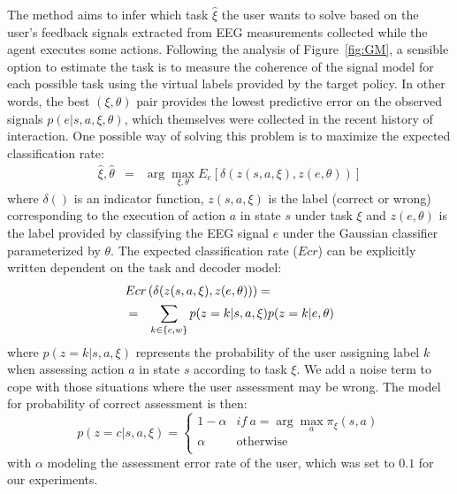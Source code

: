 The method aims to infer which task $\hat{\xi}$ the user wants to solve based on the user's feedback signals extracted from EEG measurements collected while the agent executes some actions. Following the analysis of Figure~\ref{fig:GM}, a sensible option to estimate the task is to measure the coherence of the signal model for each possible task using the virtual labels provided by the target policy. In other words, the best $(\xi,\theta)$ pair provides the lowest predictive error on the observed signals $p(e|s,a,\xi,\theta)$, which themselves were collected in the recent history of interaction. One possible way of solving this problem is to maximize the expected classification rate:
%
\begin{eqnarray}
\hat{\xi},\hat{\theta}&=& \arg\max_{\xi,\theta} E_e\left[ \delta(z(s,a,\xi), z(e,\theta)) \right]
\end{eqnarray}
%
where $\delta()$ is an indicator function, $z(s,a,\xi)$ is the label (correct or wrong) corresponding to the execution of action $a$ in state $s$ under task $\xi$ and $z(e,\theta)$ is the label provided by classifying the EEG signal $e$ under the Gaussian classifier parameterized by $\theta$. The expected classification rate ($Ecr$) can be explicitly written dependent on the task and decoder model:
%
\begin{eqnarray}
\lefteqn{Ecr\left( \delta(z(s,a,\xi), z(e,\theta)) \right) =}\nonumber\\
 &=& \sum_{k \in \{c,w\}} p(z=k|s,a,\xi) p(z=k|e,\theta)
\label{eq:ecr} 
\end{eqnarray}
%
where $p(z=k|s,a,\xi)$ represents the probability of the user assigning label $k$ when assessing action $a$ in state $s$ according to task $\xi$. We add a noise term to cope with those situations where the user assessment may be wrong. The model for probability of correct assessment is then:
%
\begin{equation}
    p(z=c|s,a,\xi) = \begin{cases}
                           1-\alpha           & if~a = \arg\max_{a} \pi_{\xi}(s,a)\\
                           \alpha             & \text{otherwise}\\
                       \end{cases}
\end{equation}
%
with $\alpha$ modeling the assessment error rate of the user, which was set to $0.1$ for our experiments.

